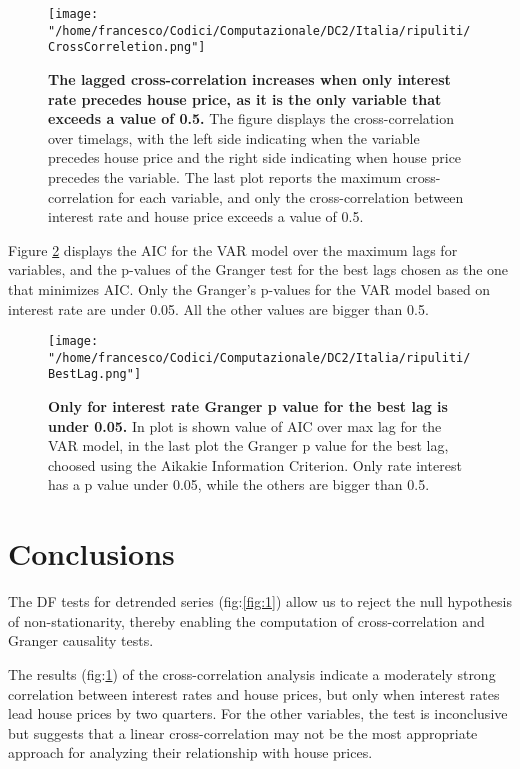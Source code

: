 \documentclass[a4paper,11pt,rmp,superscriptaddress]{report}
\begin{document}
\begin{figure}[h!]
    \texttt{[image: "/home/francesco/Codici/Computazionale/DC2/Italia/ripuliti/CrossCorreletion.png"]}
    \caption[short]{\textbf{The lagged cross-correlation increases when only interest rate precedes house price, as it is the only 
    variable that exceeds a value of 0.5.} The figure displays the cross-correlation over timelags, with the left side indicating 
    when the variable precedes house price and the right side indicating when house price precedes the variable. 
    The last plot reports the maximum cross-correlation for each variable, and only the cross-correlation between interest rate and 
    house price exceeds a value of 0.5.}
    \label{fig:2}
\end{figure}

Figure \ref*{fig:3} displays the AIC for the VAR model over the maximum lags for variables, and the p-values of the 
Granger test for the best lags chosen as the one that minimizes AIC. Only the Granger's p-values for the VAR model based on 
interest rate are under 0.05. All the other values are bigger than 0.5.

\begin{figure}[h!]
    \texttt{[image: "/home/francesco/Codici/Computazionale/DC2/Italia/ripuliti/BestLag.png"]}
    \caption[short]{\textbf{Only for interest rate Granger p value for the best lag is under 0.05.} In plot is shown value of AIC over 
    max lag for the VAR model, in the last plot the Granger p value for the best lag, choosed using the Aikakie Information Criterion.
    Only rate interest has a p value under 0.05, while the others are bigger than 0.5.}
    \label{fig:3}
\end{figure}

\section*{Conclusions}
The DF tests for detrended series (fig:\ref*{fig:1}) allow us to reject the null hypothesis of non-stationarity, 
thereby enabling the computation of cross-correlation and Granger causality tests. 

The results (fig:\ref*{fig:2}) of the cross-correlation analysis indicate a moderately strong correlation between interest rates and house prices, 
but only when interest rates lead house prices by two quarters. For the other variables, the test is inconclusive but suggests 
that a linear cross-correlation may not be the most appropriate approach for analyzing their relationship with house prices.
\end{document}
